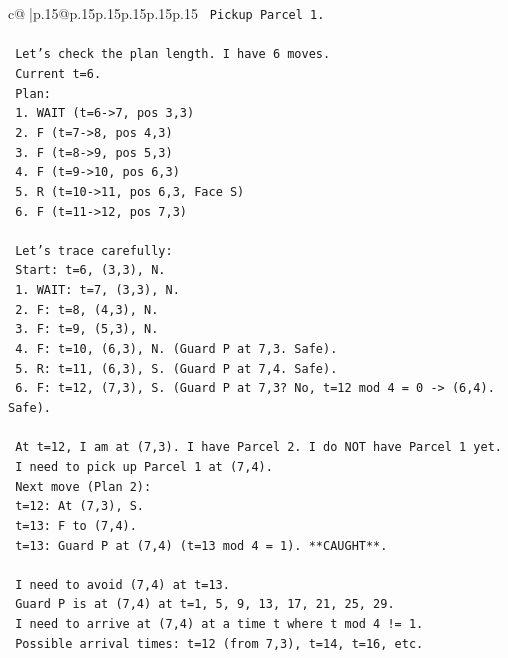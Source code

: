 \documentclass{article}
\begin{document}
{\begin{supertabular}{c@{$\;$}|p{.15\linewidth}@{}p{.15\linewidth}p{.15\linewidth}p{.15\linewidth}p{.15\linewidth}p{.15\linewidth}}
{{{\texttt{   Pickup Parcel 1.} \\
\\ 
\texttt{   Let's check the plan length. I have 6 moves.} \\
\texttt{   Current t=6.} \\
\texttt{   Plan:} \\
\texttt{   1. WAIT (t=6{-}>7, pos 3,3)} \\
\texttt{   2. F (t=7{-}>8, pos 4,3)} \\
\texttt{   3. F (t=8{-}>9, pos 5,3)} \\
\texttt{   4. F (t=9{-}>10, pos 6,3)} \\
\texttt{   5. R (t=10{-}>11, pos 6,3, Face S)} \\
\texttt{   6. F (t=11{-}>12, pos 7,3)} \\
\\ 
\texttt{   Let's trace carefully:} \\
\texttt{   Start: t=6, (3,3), N.} \\
\texttt{   1. WAIT: t=7, (3,3), N.} \\
\texttt{   2. F: t=8, (4,3), N.} \\
\texttt{   3. F: t=9, (5,3), N.} \\
\texttt{   4. F: t=10, (6,3), N. (Guard P at 7,3. Safe).} \\
\texttt{   5. R: t=11, (6,3), S. (Guard P at 7,4. Safe).} \\
\texttt{   6. F: t=12, (7,3), S. (Guard P at 7,3? No, t=12 mod 4 = 0 {-}> (6,4). Safe).} \\
\\ 
\texttt{   At t=12, I am at (7,3). I have Parcel 2. I do NOT have Parcel 1 yet.} \\
\texttt{   I need to pick up Parcel 1 at (7,4).} \\
\texttt{   Next move (Plan 2):} \\
\texttt{   t=12: At (7,3), S.} \\
\texttt{   t=13: F to (7,4).} \\
\texttt{   t=13: Guard P at (7,4) (t=13 mod 4 = 1). **CAUGHT**.} \\
\\ 
\texttt{   I need to avoid (7,4) at t=13.} \\
\texttt{   Guard P is at (7,4) at t=1, 5, 9, 13, 17, 21, 25, 29.} \\
\texttt{   I need to arrive at (7,4) at a time t where t mod 4 != 1.} \\
\texttt{   Possible arrival times: t=12 (from 7,3), t=14, t=16, etc.} \\
}}}
\end{supertabular}}
\end{document}
